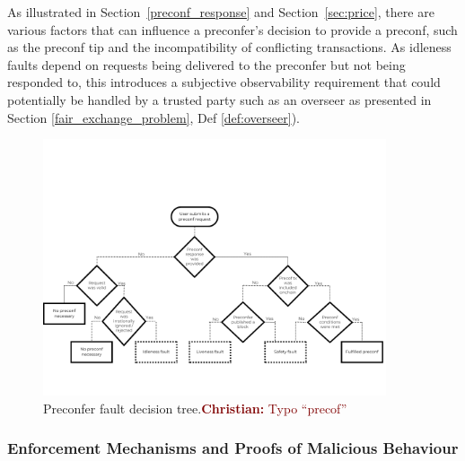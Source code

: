 \documentclass[a4paper]{article}
\theoremstyle{boldstyle}
\newcommand{\cm}[1]{\textcolor{blue}{\textbf{Conor:} #1}}
\newcommand{\dk}[1]{\textcolor{cyan}{\textbf{Demetris:} #1}}
\newcommand{\chm}[1]{\textcolor{Maroon}{\textbf{Christian:} #1}}
\begin{document}
        As illustrated in Section~\ref{preconf_response} and Section~\ref{sec:price}, there are various factors that can influence a preconfer's decision to provide a preconf, such as the preconf tip and the incompatibility of conflicting transactions. As idleness faults depend on requests being delivered to the preconfer but not being responded to, this introduces a subjective observability requirement that could potentially be handled by a trusted party such as an overseer as presented in Section \ref{fair_exchange_problem}, Def \ref{def:overseer}).
        

    \begin{figure}[htbp]
        \centering
        \includegraphics[width=0.9\textwidth]{figures/preconferFaultDecisionTree.png}
        \caption{Preconfer fault decision tree.\chm{Typo ``precof''}}
        \label{preconfer fault tree}
    \end{figure}
    

\subsubsection{Enforcement Mechanisms and Proofs of Malicious Behaviour}
\label{sec:enforcement}
\end{document}
